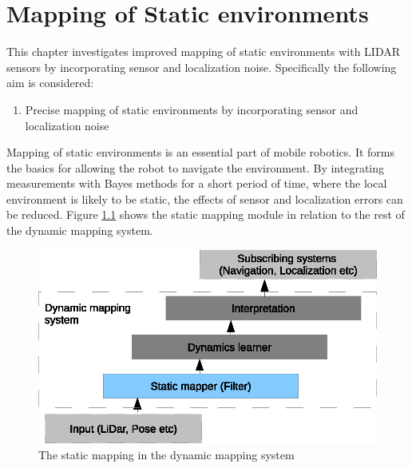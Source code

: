 \chapter{Mapping of Static environments}
This chapter investigates improved mapping of static environments with LIDAR sensors by incorporating sensor and localization noise. 
Specifically the following aim is considered:

\begin{enumerate}
    \setcounter{enumi}{0}
    \item Precise mapping of static environments by incorporating sensor and localization noise
\end{enumerate}

Mapping of static environments is an essential part of mobile robotics. It forms the basics for allowing the robot to navigate the environment. 
By integrating measurements with Bayes methods for a short period of time, where the local environment is likely to be static, the effects of sensor and localization errors can be reduced.
Figure \ref{fig:static_map_overview} shows the static mapping module in relation to the rest of the dynamic mapping system.  

\begin{figure}[htbp]
		\centering
		\includegraphics[scale=1]{chapters/static_mapping/figures/static_map_overview.eps}
		\caption{The static mapping in the dynamic mapping system}
		\label{fig:static_map_overview}
\end{figure}







